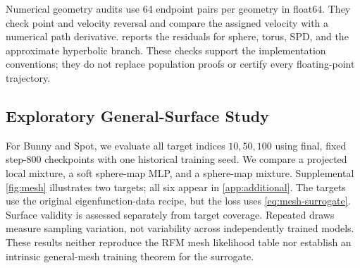 Numerical geometry audits use 64 endpoint pairs per geometry in float64. They check point and velocity reversal and compare the assigned velocity with a numerical path derivative.  reports the residuals for sphere, torus, SPD, and the approximate hyperbolic branch. These checks support the implementation conventions; they do not replace population proofs or certify every floating-point trajectory.

\subsection{Exploratory General-Surface Study}
For Bunny and Spot, we evaluate all target indices $10,50,100$ using final, fixed step-800 checkpoints with one historical training seed. We compare a projected local mixture, a soft sphere-map MLP, and a sphere-map mixture. Supplemental \cref{fig:mesh} illustrates two targets; all six appear in \cref{app:additional}. The targets use the original eigenfunction-data recipe, but the loss uses \cref{eq:mesh-surrogate}. Surface validity is assessed separately from target coverage. Repeated draws measure sampling variation, not variability across independently trained models. These results neither reproduce the RFM mesh likelihood table nor establish an intrinsic general-mesh training theorem for the surrogate.
